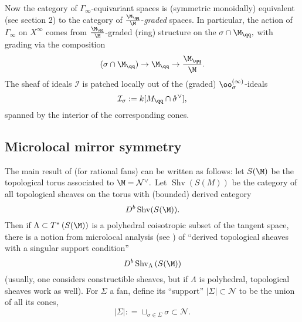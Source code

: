 \documentclass{article}
\newcommand{\shv}{\operatorname{Shv}}
\newcommand{\I}{\mathcal{I}}
\newcommand{\N}{\mathcal{N}}
\begin{document}
Now the category of $\Gamma_\infty$-equivariant spaces is (symmetric monoidally) equivalent (see \cite{vtor} section 2) to the category of $\frac{\M_\qq}{\M}$-\emph{graded} spaces. In particular, the action of $\Gamma_\infty$ on $X^{\infty}$ comes from $\frac{\M_\qq}{\M}$-graded (ring) structure on the $\sigma\cap \M_\qq,$ with grading via the composition $$(\sigma\cap \M_\qq)\to \M_\qq\to \frac{\M_\qq}{\M}.$$ The sheaf of ideals $\I$ is patched locally out of the (graded) $\oo_\sigma^{(\infty)}$-ideals $$\I_\sigma : = k[M_\qq\cap \mathring{\sigma}^\vee],$$ spanned by the interior of the corresponding cones. 

\subsection{Microlocal mirror symmetry}
The main result of \cite{vtor} (for rational fans) can be written as follows: let $S(\M)$ be the topological torus associated to $\M = \N^\vee.$ Let $\shv\left(S(M)\right)$ be the category of all topological sheaves on the torus with (bounded) derived category $$D^b\shv(S(\M)).$$ Then if $\Lambda\subset T^*\left(S(\M)\right)$ is a polyhedral coisotropic subset of the tangent space, there is a notion from microlocal analysis (see \cite{kashapira}) of ``derived topological sheaves with a singular support condition'' $$D^b\shv_\Lambda\left(S(\M)\right)$$ (usually, one considers constructible sheaves, but if $\Lambda$ is polyhedral, topological sheaves work as well). For $\Sigma$ a fan, define its ``support'' $|\Sigma|\subset \N$ to be the union of all its cones, $$|\Sigma| : = \sqcup_{\sigma\in \Sigma}\sigma\subset \N.$$
\end{document}
